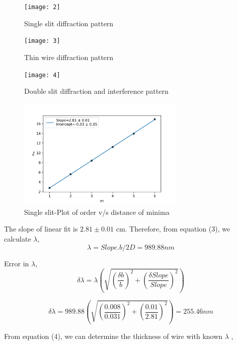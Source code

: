 \documentclass[a4paper, amsfonts, amssymb, amsmath, reprint, showkeys, nofootinbib, twoside]{revtex4-1}
\begin{document}
\begin{figure}[H] %
	\centering
	\texttt{[image: 2]} 
	\caption{Single slit diffraction pattern}
\end{figure}

\begin{figure}[H] %
	\centering
	\texttt{[image: 3]} 
	\caption{Thin wire diffraction pattern}
\end{figure}

\begin{figure}[H] %
	\centering
	\texttt{[image: 4]} 
	\caption{Double slit diffraction and interference pattern}
\end{figure}

\begin{figure}[H] %
	\centering
	\includegraphics[width=8cm]{p1} 
	\caption{Single slit-Plot of order v/s distance of minima}
\end{figure}

The slope of linear fit is $2.81\pm0.01$ cm. Therefore, from equation (3), we calculate $\lambda$,
\begin{equation}
	\lambda=Slope. b/2D= 989.88 nm
\end{equation}

Error in $\lambda$,
\begin{equation}
\delta \lambda=\lambda \left(\sqrt{\left(\frac{\delta b}{b}\right)^2+\left(\frac{\delta Slope}{Slope}\right)^2}\right)
\end{equation}

\begin{equation}
	\delta \lambda=989.88 \left(\sqrt{\left(\frac{0.008}{0.031}\right)^2+\left(\frac{0.01}{2.81}\right)^2}\right)=255.46 nm
\end{equation}

From equation (4), we can determine the thickness of wire with known $\lambda$ ,
\end{document}
